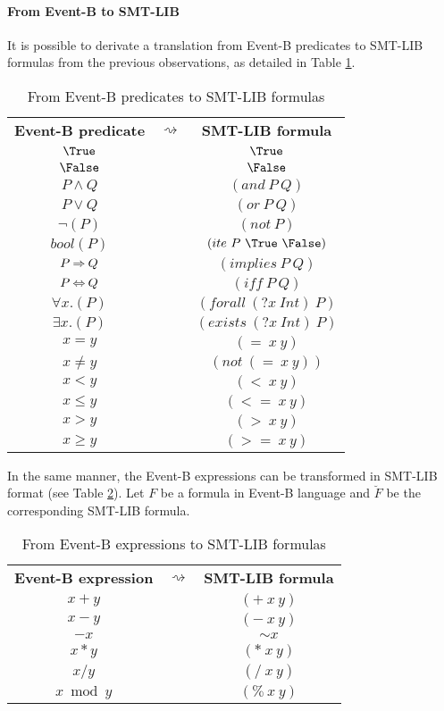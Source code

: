 \paragraph{From Event-B to SMT-LIB}
It is possible to derivate a translation from Event-B predicates to SMT-LIB formulas from the previous observations, as detailed in Table \ref{BPRED2SMTLIB}.
\begin{table}[htbp]
\begin{center}
\begin{tabular}{ccc}
 \textbf{Event-B predicate} & \textbf{$\rightsquigarrow$} & \textbf{SMT-LIB formula} \\ 
 $\True$ & & $\True$ \\
 $\False$ & & $\False$ \\
 $P \land Q$ & & $(and~P~Q)$ \\
 $P \lor Q$ & & $(or~P~Q)$ \\
 $\lnot(P)$ & & $(not~P)$ \\
 $bool(P)$ & & $(ite~P~\True~\False)$ \\
 $P \mathbin\Rightarrow Q$ & & $(implies~P~Q)$ \\
 $P \mathbin\Leftrightarrow Q$ & & $(iff~P~Q)$ \\
 $\forall{x}.(P)$ & & $(forall~(?x~Int)~P)$ \\
 $\exists{x}.(P)$ & & $(exists~(?x~Int)~P)$ \\
 $x = y$ & & $(=~x~y)$ \\
 $x \neq y$ & & $(not~(=~x~y))$ \\
 $x < y$ & & $(<~x~y)$ \\
 $x \leq y$ & & $(<=~x~y)$ \\
 $x > y$ & & $(>~x~y)$ \\
 $x \geq y$ & & $(>=~x~y)$ \\
\end{tabular} 
\end{center}
\caption{From Event-B predicates to SMT-LIB formulas}
\label{BPRED2SMTLIB}
\end{table}

In the same manner, the Event-B expressions can be transformed in SMT-LIB format (see Table \ref{BEXPR2SMTLIB}).
Let $F$ be a formula in Event-B language and $\breve{F}$ be the corresponding SMT-LIB formula.

\begin{table}[htbp]
\begin{center}
\begin{tabular}{ccc}
 \textbf{Event-B expression} & \textbf{$\rightsquigarrow$} & \textbf{SMT-LIB formula} \\ 
 $x + y$ & & $(+~x~y)$ \\
 $x - y$ & & $(-~x~y)$ \\
 $-x$ & & $\sim x$ \\
 $x * y$ & & $(*~x~y)$ \\
 $x / y$ & & $(/~x~y)$ \\
 $x \bmod y$ & & $(\%~x~y)$ \\
\end{tabular} 
\end{center}
\caption{From Event-B expressions to SMT-LIB formulas}
\label{BEXPR2SMTLIB}
\end{table}

